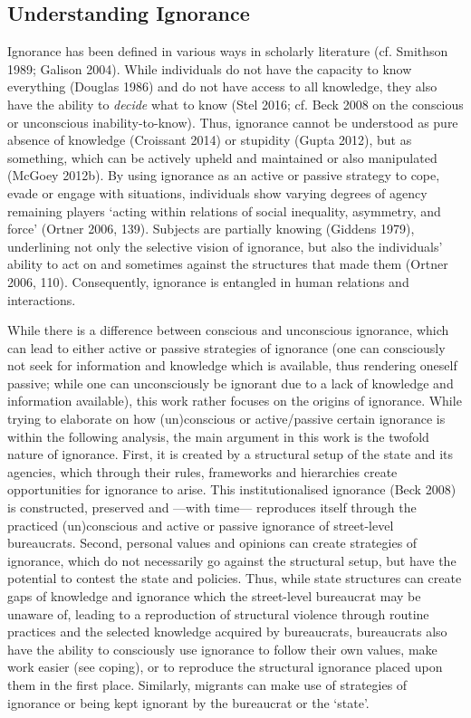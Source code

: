 \subsection{Understanding Ignorance}
Ignorance has been defined in various ways in scholarly literature (cf. Smithson 1989; Galison 2004). While individuals do not have the capacity to know everything  (Douglas 1986) and do not have access to all knowledge, they also have the ability to \emph{decide} what to know (Stel 2016; cf. Beck 2008 on the conscious or unconscious inability-to-know). Thus, ignorance cannot be understood as pure absence of knowledge (Croissant 2014) or stupidity (Gupta 2012), but as something, which can be actively upheld and maintained or also manipulated (McGoey 2012b). By using ignorance as an active or passive strategy to cope, evade or engage with situations, individuals show varying degrees of agency remaining players ‘acting within relations of social inequality, asymmetry, and force’ (Ortner 2006, 139). Subjects are partially knowing (Giddens 1979), underlining not only the selective vision of ignorance, but also the individuals’ ability to act on and sometimes against the structures that made them (Ortner 2006, 110). Consequently, ignorance is entangled in human relations and interactions.
\par
While there is a difference between conscious and unconscious ignorance, which can lead to either active or passive strategies of ignorance (one can consciously not seek for information and knowledge which is available, thus rendering oneself passive; while one can unconsciously be ignorant due to a lack of knowledge and information available), this work rather focuses on the origins of ignorance. While trying to elaborate on how (un)conscious or active/passive certain ignorance is within the following analysis, the main argument in this work is the twofold nature of ignorance. First, it is created by a structural setup of the state and its agencies, which through their rules, frameworks and hierarchies create opportunities for ignorance to arise. This institutionalised ignorance (Beck 2008) is constructed, preserved and ---with time--- reproduces itself through the practiced (un)conscious and active or passive ignorance of street-level bureaucrats. Second,  personal values and opinions can create strategies of ignorance, which do not necessarily go against the structural setup, but have the potential to contest the state and policies. Thus, while state structures can create gaps of knowledge and ignorance  which the street-level bureaucrat may be unaware of, leading to a reproduction of structural violence through routine practices and the selected knowledge acquired by bureaucrats, bureaucrats also have the ability to consciously use ignorance to follow their own values, make work easier (see coping), or to reproduce the structural ignorance placed upon them in the first place. Similarly, migrants can make use of strategies of ignorance or being kept ignorant by the bureaucrat or the ‘state’.
